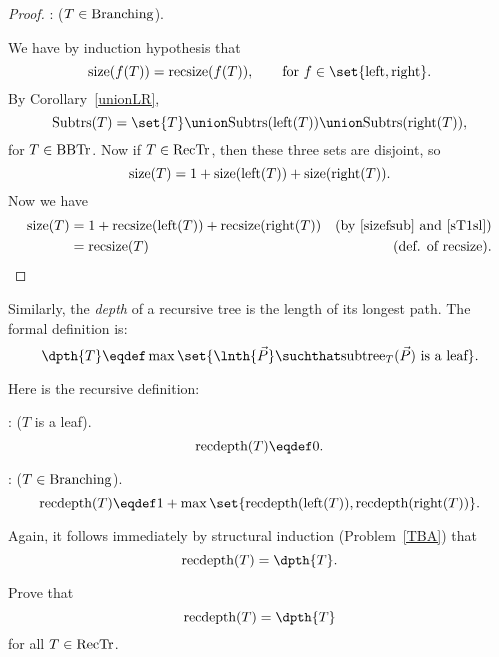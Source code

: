 \begin{definition}
\begin{lemma}
\begin{proof}
: ($T \in\text{Branching}$).

We have by induction hypothesis that
\begin{equation}\label{sizefsub}
\text{size}(f(T)) = \trsize{(f(T))}, \qquad  \text{for}\ f \in \set{\leftsub{}, \rightsub{}}.
\end{equation}
By Corollary~\ref{unionLR},
\[
\subbrn{T} = \set{T} \union \subbrn{\leftsub{(T)}} \union \subbrn{\rightsub{(T)}},
\]
for $T \in \text{BBTr}$.  Now if $T \in \text{RecTr}$, then these three sets are disjoint, so
\begin{equation}\label{sT1sl}
\text{size}(T) = 1 + \text{size}(\text{left}(T)) + \text{size}(\text{right}(T)).
\end{equation}
Now we have
\begin{align*}
\text{size}(T)
 & = 1 + \text{recsize}(\text{left}(T)) + \text{recsize}(\text{right}(T))
   & \text{(by~\eqref{sizefsub} and~\eqref{sT1sl})}\\
 & = \text{recsize}(T) 
   & \text{(def. of \text{recsize})}.
\end{align*}
\end{proof}
\end{lemma}

Similarly, the \emph{depth}  of a recursive tree is
the length of its longest path.  The formal definition is:
\begin{equation}\label{defdepth}
\dpth{T} \eqdef \max \set{\lnth{\vec{P}} \suchthat
  \rslt{T}{(\vec{P})}\ \text{is a leaf}}.
\end{equation}

Here is the recursive definition:
\begin{definition}
: ($T$ is a leaf).
\[
\trdpth{(T)} \eqdef 0.
\]

: ($T \in\text{Branching}$).
\[
\trdpth{(T)} \eqdef 1+\max\set{\trdpth{(\leftsub{(T)})}, \trdpth{(\rightsub{(T)})}}.
\]
\end{definition}

Again, it follows immediately by structural induction
(Problem~\ref{TBA}) that
\begin{equation}\label{recdepth=depth}
\trdpth{(T)} = \dpth{T}.
\end{equation}

\begin{problem}
Prove that
\[
\trdpth{(T)} = \dpth{T}
\]
for all $T \in \text{RecTr}$.

\begin{solution}
\end{solution}
\end{problem}


\end{definition}
